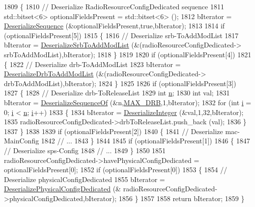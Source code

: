 \begin{DoxyCode}
1809 \{
1810   \textcolor{comment}{// Deserialize RadioResourceConfigDedicated sequence}
1811   std::bitset<6> optionalFieldsPresent = std::bitset<6> ();
1812   bIterator = \hyperlink{classns3_1_1Asn1Header_a58c68bb97ba3fe2e8fcdd7c208d672b2}{DeserializeSequence} (&optionalFieldsPresent,\textcolor{keyword}{true},bIterator);
1813 
1814   \textcolor{keywordflow}{if} (optionalFieldsPresent[5])
1815     \{
1816       \textcolor{comment}{// Deserialize srb-ToAddModList}
1817       bIterator = \hyperlink{classns3_1_1RrcAsn1Header_af7a6d8ce57df3b35dc2ec29a4850b79c}{DeserializeSrbToAddModList} (&(radioResourceConfigDedicated->
      srbToAddModList),bIterator);
1818     \}
1819 
1820   \textcolor{keywordflow}{if} (optionalFieldsPresent[4])
1821     \{
1822       \textcolor{comment}{// Deserialize drb-ToAddModList}
1823       bIterator = \hyperlink{classns3_1_1RrcAsn1Header_ad41f6d1c14d8d4f5a8178581d12af3c5}{DeserializeDrbToAddModList} (&(radioResourceConfigDedicated->
      drbToAddModList),bIterator);
1824     \}
1825 
1826   \textcolor{keywordflow}{if} (optionalFieldsPresent[3])
1827     \{
1828       \textcolor{comment}{// Deserialize drb-ToReleaseList}
1829       \textcolor{keywordtype}{int} \hyperlink{namespacesample-rng-plot_aeb5ee5c431e338ef39b7ac5431242e1d}{n};
1830       \textcolor{keywordtype}{int} val;
1831       bIterator = \hyperlink{classns3_1_1Asn1Header_a1a7245e05b482df8abade0a060bd0ecc}{DeserializeSequenceOf} (&n,\hyperlink{lte-rrc-header_8cc_a3007772924a76edef0d1eb9c400abdac}{MAX\_DRB},1,bIterator);
1832       \textcolor{keywordflow}{for} (\textcolor{keywordtype}{int} \hyperlink{bernuolliDistribution_8m_a6f6ccfcf58b31cb6412107d9d5281426}{i} = 0; \hyperlink{bernuolliDistribution_8m_a6f6ccfcf58b31cb6412107d9d5281426}{i} < \hyperlink{namespacesample-rng-plot_aeb5ee5c431e338ef39b7ac5431242e1d}{n}; \hyperlink{bernuolliDistribution_8m_a6f6ccfcf58b31cb6412107d9d5281426}{i}++)
1833         \{
1834           bIterator = \hyperlink{classns3_1_1Asn1Header_a49802c9af30018b078150e866b6ecae2}{DeserializeInteger} (&val,1,32,bIterator);
1835           radioResourceConfigDedicated->drbToReleaseList.push\_back (val);
1836         \}
1837     \}
1838 
1839   \textcolor{keywordflow}{if} (optionalFieldsPresent[2])
1840     \{
1841       \textcolor{comment}{// Deserialize mac-MainConfig}
1842       \textcolor{comment}{// ...}
1843     \}
1844 
1845   \textcolor{keywordflow}{if} (optionalFieldsPresent[1])
1846     \{
1847       \textcolor{comment}{// Deserialize sps-Config}
1848       \textcolor{comment}{// ...}
1849     \}
1850 
1851   radioResourceConfigDedicated->havePhysicalConfigDedicated = optionalFieldsPresent[0];
1852   \textcolor{keywordflow}{if} (optionalFieldsPresent[0])
1853     \{
1854       \textcolor{comment}{// Deserialize physicalConfigDedicated}
1855       bIterator = \hyperlink{classns3_1_1RrcAsn1Header_a32dfda6b17e399d6727f7a16e48399ed}{DeserializePhysicalConfigDedicated} (&
      radioResourceConfigDedicated->physicalConfigDedicated,bIterator);
1856     \}
1857 
1858   \textcolor{keywordflow}{return} bIterator;
1859 \}
\end{DoxyCode}


